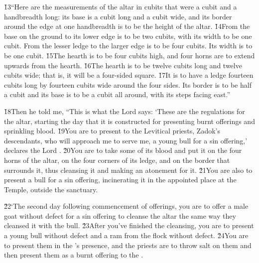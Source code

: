 \v{13}``Here are the measurements of the altar in cubits that were a cubit and a handbreadth long: its base is a cubit long and a cubit wide, and its border around the edge at one handbreadth is to be the height of the altar. \v{14}From the base on the ground to its lower edge is to be two cubits, with its width to be one cubit. From the lesser ledge to the larger edge is to be four cubits. Its width is to be one cubit. \v{15}The hearth is to be four cubits high, and four horns are to extend upwards from the hearth. \v{16}The hearth is to be twelve cubits long and twelve cubits wide; that is, it will be a four-sided square. \v{17}It is to have a ledge fourteen cubits long by fourteen cubits wide around the four sides. Its border is to be half a cubit and its base is to be a cubit all around, with its steps facing east.''

\v{18}Then he told me, ``This is what the Lord  says: `These are the regulations for the altar, starting the day that it is constructed for presenting burnt offerings and sprinkling blood. \v{19}You are to present to the Levitical priests, Zadok's descendants, who will approach me to serve me, a young bull for a sin offering,' declares the Lord . \v{20}You are to take some of its blood and put it on the four horns of the altar, on the four corners of its ledge, and on the border that surrounds it, thus cleansing it and making an atonement for it. \v{21}You are also to present a bull for a sin offering, incinerating it in the appointed place at the Temple, outside the sanctuary.

\v{22}`The second day following commencement of offerings, you are to offer a male goat without defect for a sin offering to cleanse the altar the same way they cleansed it with the bull. \v{23}After you've finished the cleansing, you are to present a young bull without defect and a ram from the flock without defect. \v{24}You are to present them in the 's presence, and the priests are to throw salt on them and then present them as a burnt offering to the .

